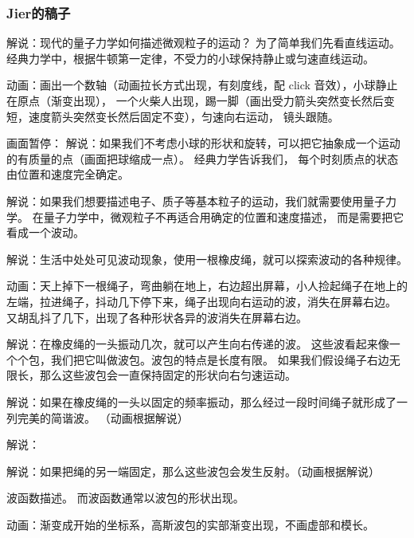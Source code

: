 
\begin{issues}
\issueDraft
\end{issues}


\subsubsection{Jier的稿子}









解说：现代的量子力学如何描述微观粒子的运动？ 为了简单我们先看直线运动。 经典力学中，根据牛顿第一定律，不受力的小球保持静止或匀速直线运动。

动画：画出一个数轴（动画拉长方式出现，有刻度线，配 click 音效），小球静止在原点（渐变出现）， 一个火柴人出现，踢一脚（画出受力箭头突然变长然后变短，速度箭头突然变长然后固定不变），匀速向右运动， 镜头跟随。

画面暂停： 解说：如果我们不考虑小球的形状和旋转，可以把它抽象成一个运动的有质量的点（画面把球缩成一点）。 经典力学告诉我们， 每个时刻质点的状态由位置和速度完全确定。

解说：如果我们想要描述电子、质子等基本粒子的运动，我们就需要使用量子力学。 在量子力学中，微观粒子不再适合用确定的位置和速度描述， 而是需要把它看成一个波动。

解说：生活中处处可见波动现象，使用一根橡皮绳，就可以探索波动的各种规律。

动画：天上掉下一根绳子，弯曲躺在地上，右边超出屏幕，小人捡起绳子在地上的左端，拉进绳子，抖动几下停下来，绳子出现向右运动的波，消失在屏幕右边。 又胡乱抖了几下，出现了各种形状各异的波消失在屏幕右边。

解说：在橡皮绳的一头振动几次，就可以产生向右传递的波。 这些波看起来像一个个包，我们把它叫做波包。波包的特点是长度有限。 如果我们假设绳子右边无限长，那么这些波包会一直保持固定的形状向右匀速运动。

解说：如果在橡皮绳的一头以固定的频率振动，那么经过一段时间绳子就形成了一列完美的简谐波。
（动画根据解说）

解说：

解说：如果把绳的另一端固定，那么这些波包会发生反射。（动画根据解说）




波函数描述。 而波函数通常以波包的形状出现。

动画：渐变成开始的坐标系，高斯波包的实部渐变出现，不画虚部和模长。

